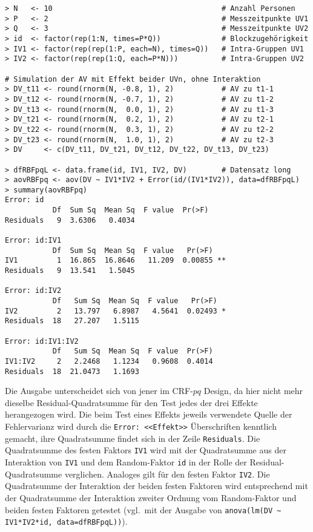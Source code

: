 \begin{lstlisting}
> N   <- 10                                       # Anzahl Personen
> P   <- 2                                        # Messzeitpunkte UV1
> Q   <- 3                                        # Messzeitpunkte UV2
> id  <- factor(rep(1:N, times=P*Q))              # Blockzugehörigkeit
> IV1 <- factor(rep(rep(1:P, each=N), times=Q))   # Intra-Gruppen UV1
> IV2 <- factor(rep(rep(1:Q, each=P*N)))          # Intra-Gruppen UV2

# Simulation der AV mit Effekt beider UVn, ohne Interaktion
> DV_t11 <- round(rnorm(N, -0.8, 1), 2)           # AV zu t1-1
> DV_t12 <- round(rnorm(N, -0.7, 1), 2)           # AV zu t1-2
> DV_t13 <- round(rnorm(N,  0.0, 1), 2)           # AV zu t1-3
> DV_t21 <- round(rnorm(N,  0.2, 1), 2)           # AV zu t2-1
> DV_t22 <- round(rnorm(N,  0.3, 1), 2)           # AV zu t2-2
> DV_t23 <- round(rnorm(N,  1.0, 1), 2)           # AV zu t2-3
> DV     <- c(DV_t11, DV_t21, DV_t12, DV_t22, DV_t13, DV_t23)

> dfRBFpqL <- data.frame(id, IV1, IV2, DV)        # Datensatz long
> aovRBFpq <- aov(DV ~ IV1*IV2 + Error(id/(IV1*IV2)), data=dfRBFpqL)
> summary(aovRBFpq)
Error: id
           Df  Sum Sq  Mean Sq  F value  Pr(>F)
Residuals   9  3.6306   0.4034

Error: id:IV1
           Df  Sum Sq  Mean Sq  F value   Pr(>F)
IV1         1  16.865  16.8646   11.209  0.00855 **
Residuals   9  13.541   1.5045

Error: id:IV2
           Df   Sum Sq  Mean Sq  F value   Pr(>F)
IV2         2   13.797   6.8987   4.5641  0.02493 *
Residuals  18   27.207   1.5115

Error: id:IV1:IV2
           Df   Sum Sq  Mean Sq  F value  Pr(>F)
IV1:IV2     2   2.2468   1.1234   0.9608  0.4014
Residuals  18  21.0473   1.1693
\end{lstlisting}

Die Ausgabe unterscheidet sich von jener im CRF-$pq$ Design, da hier nicht mehr dieselbe Residual-Quadratsumme für den Test jedes der drei Effekte herangezogen wird. Die beim Test eines Effekts jeweils verwendete Quelle der Fehlervarianz wird durch die \lstinline!Error: <<Effekt>>! Überschriften kenntlich gemacht, ihre Quadratsumme findet sich in der Zeile \lstinline!Residuals!. Die Quadratsumme des festen Faktors \lstinline!IV1! wird mit der Quadratsumme aus der Interaktion von \lstinline!IV1! und dem Random-Faktor \lstinline!id! in der Rolle der Residual-Quadratsumme verglichen. Analoges gilt für den festen Faktor \lstinline!IV2!. Die Quadratsumme der Interaktion der beiden festen Faktoren wird entsprechend mit der Quadratsumme der Interaktion zweiter Ordnung vom Random-Faktor und beiden festen Faktoren getestet (vgl.\ mit der Ausgabe von \lstinline!anova(lm(DV ~ IV1*IV2*id, data=dfRBFpqL))!).

